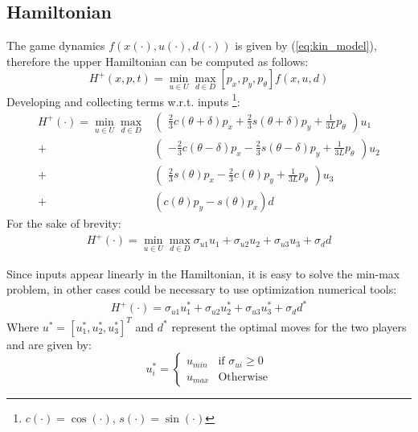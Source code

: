 \subsection{Hamiltonian}
The game dynamics $f(x(\cdot), u(\cdot), d(\cdot))$ is given by (\ref{eq:kin_model}), therefore the upper Hamiltonian can be computed as follows:
\begin{equation*}
  H^+(x,p,t) = \min_{u \in U}\max_{d \in D} [p_x, p_y, p_{\theta}] f(x, u, d)
\end{equation*}
Developing and collecting terms w.r.t. inputs \footnote{$c(\cdot)=\cos(\cdot)$, $s(\cdot)=\sin(\cdot)$}:
\begin{equation*}
  \begin{split}
    H^{+}(\cdot) = \min_{u \in U}\max_{d \in D} 
    &
      \begin{pmatrix}
        \frac{2}{3}c{(\theta + \delta)}p_x +  \frac{2}{3}s{(\theta + \delta)}p_y + \frac{1}{3L}p_{\theta}
      \end{pmatrix}u_{1} 
    \\ +  
    &
      \begin{pmatrix}
        -\frac{2}{3}c{(\theta -\delta)}p_x -\frac{2}{3}s{(\theta -\delta)}p_y + \frac{1}{3L}p_{\theta} 
      \end{pmatrix}u_{2} 
    \\ +  
    &
      \begin{pmatrix}
        \frac{2}{3}s{(\theta)}p_x -\frac{2}{3}c{(\theta)}p_y + \frac{1}{3L}p_{\theta} 
      \end{pmatrix}u_{3} 
    \\ + 
    &
      (c{(\theta)}p_y-s{(\theta)}p_x)d
  \end{split}
\end{equation*}
For the sake of brevity:
\begin{equation*}
  \begin{split}
    H^{+}(\cdot) = \min_{u \in U}\max_{d \in D} \sigma_{u1} u_{1} +\sigma_{u2} u_{2} + \sigma_{u3} u_{3} + \sigma_{d} d
  \end{split}
\end{equation*}

Since inputs appear linearly in the Hamiltonian, it is easy to solve the min-max problem, in other cases could be necessary to use optimization numerical tools:
\begin{equation}
  \begin{split}
    H^{+}(\cdot) = \sigma_{u1} u_{1}^* +\sigma_{u2} u_{2}^* + \sigma_{u3} u_{3}^* + \sigma_{d} d^*
  \end{split}
  \label{opt_ham}
\end{equation}
Where $u^* = [u_1^*, u_2^*, u_3^*]^T$ and $d^*$ represent the optimal moves for the two players and are given by:
\begin{equation}
  u_i^* = 
	\begin{cases} 
		u_{min} &\text{if } \sigma_{ui} \geq 0\\
		u_{max} &\text{Otherwise} 
	\end{cases}
\end{equation}

